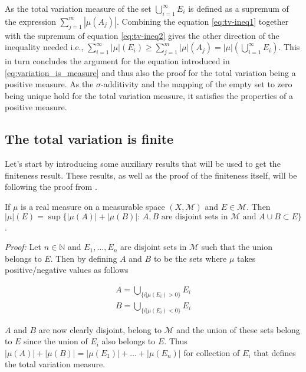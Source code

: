 \documentclass[12pt]{artikel1}
\begin{document}
As the total variation measure of the set $\bigcup_{i=1}^\infty E_i$ is defined as a supremum of the expression $\sum_{j=1}^m|\mu(A_j)|$. Combining the equation \ref{eq:tv-ineq1} together with the supremum of equation \ref{eq:tv-ineq2} gives the other direction of the inequality needed i.e., $\sum_{i=1}^\infty|\mu|(E_i)\geq\sum_{j=1}^m|\mu|(A_j)=|\mu|\left(\bigcup_{i=1}^\infty E_i\right)$. This in turn concludes the argument for the equation introduced in \ref{eq:variation_is_measure} and thus also the proof for the total variation being a positive measure. As the $\sigma$-additivity and the mapping of the empty set to zero being unique hold for the total variation measure, it satisfies the properties of a positive measure.
\rightline{$\blacksquare$}

\subsection*{The total variation is finite}

Let's start by introducing some auxiliary results that will be used to get the finiteness result. These results, as well as the proof of the finiteness itself, will be following the proof from \autocite{axler_measure_2019}.

\begin{proposition}[colback=white,label=prop:decomp]
    If $\mu$ is a real measure on a measurable space $(X,\mathcal{M})$ and $E\in\mathcal{M}$. Then $|\mu|(E)=\sup\{|\mu(A)|+|\mu(B)|:\,A,B\text{ are disjoint sets in }\mathcal{M}\text{ and }A\cup B\subset E\}$.
\end{proposition}

\textit{Proof:} Let $n\in\mathbb{N}$ and $E_1,\ldots,E_n$ are disjoint sets in $\mathcal{M}$ such that the union belongs to $E$. Then by defining $A$ and $B$ to be the sets where $\mu$ takes positive/negative values as follows

\begin{gather*}
    A=\bigcup_{\{i|\mu(E_i)>0\}}E_i \\
    B=\bigcup_{\{i|\mu(E_i)<0\}}E_i
\end{gather*}

\noindent $A$ and $B$ are now clearly disjoint, belong to $\mathcal{M}$ and the union of these sets belong to $E$ since the union of $E_i$ also belongs to $E$. Thus $|\mu(A)|+|\mu(B)|=|\mu(E_1)|+\ldots+|\mu(E_n)|$ for collection of $E_i$ that defines the total variation measure.

\rightline{$\blacksquare$}
\end{document}

